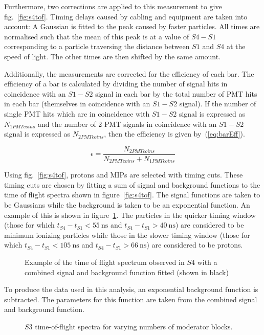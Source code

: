 	Furthermore, two corrections are applied to this measurement to give fig.~\ref{fig:s4tof}. 
	Timing delays caused by cabling and equipment are taken into account:
	A Gaussian is fitted to the peak caused by faster particles.
	All times are normalised such that the mean of this peak is at a value of $S4 - S1$ corresponding to a particle traversing the distance between $S1$ and $S4$ at the speed of light. 
	The other times are then shifted by the same amount.
	
	Additionally, the measurements are corrected for the efficiency of each bar. 
	The efficiency of a bar is calculated by dividing the number of signal hits in coincidence with an $S1-S2$ signal in each bar by the total number of PMT hits in each bar (themselves in coincidence with an $S1-S2$ signal). 
	If the number of single PMT hits which are in coincidence with $S1-S2$ signal is expressed as $N_{1PMTcoins}$ and the number of 2 PMT signals in coincidence with an $S1-S2$ signal is expressed as $N_{2PMTcoins}$, then the efficiency is given by~(\ref{eq:barEff}).
	
	\begin{equation}
		\epsilon = \frac{N_{2PMTcoins}}{N_{2PMTcoins}+N_{1PMTcoins}}
		\label{eq:barEff}
	\end{equation}
	
	Using fig.~\ref{fig:s4tof}, protons and MIPs are selected with timing cuts. 
	These timing cuts are chosen by fitting a sum of signal and background functions to the time of flight spectra shown in figure~\ref{fig:s4tof}. 
	The signal functions are taken to be Gaussians while the background is taken to be an exponential function. 
	An example of this is shown in figure~\ref{fig:fitEx}.
	The particles in the quicker timing window (those for which $t_{S4}-t_{S1}<55~\text{ns}$ and $t_{S4}-t_{S1}>40~\text{ns}$) are considered to be minimum ionizing particles while those in the slower timing window (those for which $t_{S4}-t_{S1}<105~\text{ns}$ and $t_{S4}-t_{S1}>66~\text{ns}$) are considered to be protons.
	
	\begin{figure}[h]
		\begin{adjustbox}{max totalsize={.7\textwidth}{.62\textheight},center}
			
		\end{adjustbox}
		\caption{Example of the time of flight spectrum observed in $S4$ with a combined signal and background function fitted (shown in black)}
		\label{fig:fitEx}
	\end{figure}

	To produce the data used in this analysis, an exponential background function is subtracted. 
	The parameters for this function are taken from the combined signal and background function.

	\begin{figure}[h]
		\begin{adjustbox}{max totalsize={.8\textwidth}{.5\textheight},center}
			
		\end{adjustbox}
		\caption{$S3$ time-of-flight spectra for varying numbers of moderator blocks.}
		\label{fig:s3tof}
	\end{figure}
	